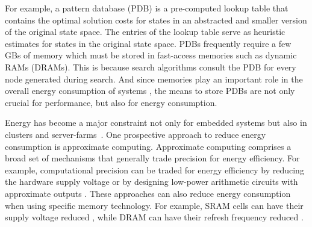 \documentclass[letterpaper]{article}
\begin{document}
For example, a pattern database (PDB) is a pre-computed lookup table that contains the optimal solution costs for states in an abstracted and smaller version of the original state space. The entries of the lookup table serve as heuristic estimates for states in the original state space.
PDBs frequently require a few GBs of memory which must be stored in fast-access memories such as dynamic RAMs (DRAMs). This is because search algorithms consult the PDB for every node generated during search. And since memories play an important role in the overall energy consumption of systems \cite{5695550}, the means to store PDBs are not only crucial for performance, but also for energy consumption.

Energy has become a major constraint not only for embedded systems but also in clusters and server-farms~\cite{Cameron2005}. One prospective approach to reduce energy consumption is approximate computing. Approximate computing comprises a broad set of mechanisms that generally trade precision for energy efficiency. For example, computational precision can be traded for energy efficiency by reducing the hardware supply voltage
\cite{974895} or by designing low-power arithmetic circuits with approximate outputs \cite{5993675}. These approaches can also reduce energy consumption when using specific memory technology. For example, SRAM cells can have their supply voltage reduced \cite{5686921}, while DRAM can have their refresh frequency reduced \cite{Liu:2011:FSD:1950365.1950391}. %
\end{document}
